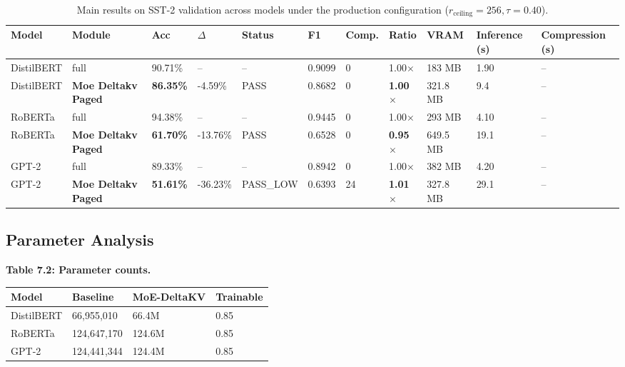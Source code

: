 \begin{table}[t]
\centering
\small
\begin{tabular}{lllllllllll}
\toprule
\textbf{Model} & \textbf{Module} & \textbf{Acc} & \textbf{$\Delta$} & \textbf{Status} & \textbf{F1} & \textbf{Comp.} & \textbf{Ratio} & \textbf{VRAM} & \textbf{Inference (s)} & \textbf{Compression (s)} \\
\midrule
DistilBERT & full & 90.71\% & -- & -- & 0.9099 & 0 & 1.00$\times$ & 183 MB & 1.90 & -- \\
DistilBERT & \textbf{Moe Deltakv Paged} & \textbf{86.35\%} & -4.59\% & PASS & 0.8682 & 0 & \textbf{1.00$\times$} & 321.8 MB & 9.4 & -- \\
RoBERTa & full & 94.38\% & -- & -- & 0.9445 & 0 & 1.00$\times$ & 293 MB & 4.10 & -- \\
RoBERTa & \textbf{Moe Deltakv Paged} & \textbf{61.70\%} & -13.76\% & PASS & 0.6528 & 0 & \textbf{0.95$\times$} & 649.5 MB & 19.1 & -- \\
GPT-2 & full & 89.33\% & -- & -- & 0.8942 & 0 & 1.00$\times$ & 382 MB & 4.20 & -- \\
GPT-2 & \textbf{Moe Deltakv Paged} & \textbf{51.61\%} & -36.23\% & PASS_LOW & 0.6393 & 24 & \textbf{1.01$\times$} & 327.8 MB & 29.1 & -- \\
\bottomrule
\end{tabular}
\caption{Main results on SST-2 validation across models under the production configuration ($r_{\mathrm{ceiling}}=256, \tau=0.40$).}
\label{tab:main_sst2}
\end{table}

\subsection{Parameter Analysis}

\textbf{Table 7.2: Parameter counts.}

\begin{table}[H]
\centering
\small
\begin{tabular}{llll}
\toprule
\textbf{Model} & \textbf{Baseline} & \textbf{MoE-DeltaKV} & \textbf{Trainable} \\
\midrule
DistilBERT & 66,955,010 & 66.4M & 0.85 \\
RoBERTa & 124,647,170 & 124.6M & 0.85 \\
GPT-2 & 124,441,344 & 124.4M & 0.85 \\
\bottomrule
\end{tabular}
\end{table}

